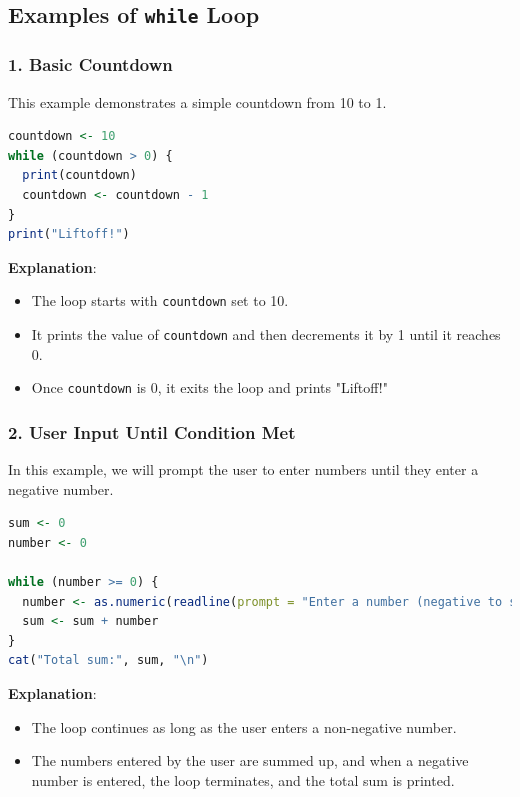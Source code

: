 \documentclass[10pt]{book}
\begin{document}
\subsection{Examples of \texttt{while} Loop}

\subsubsection{1. Basic Countdown}

This example demonstrates a simple countdown from 10 to 1.

\begin{lstlisting}[language=R]
countdown <- 10
while (countdown > 0) {
  print(countdown)
  countdown <- countdown - 1
}
print("Liftoff!")
\end{lstlisting}

\textbf{Explanation}:
\begin{itemize}
    \item The loop starts with \texttt{countdown} set to 10.
    \item It prints the value of \texttt{countdown} and then decrements it by 1 until it reaches 0.
    \item Once \texttt{countdown} is 0, it exits the loop and prints "Liftoff!"
\end{itemize}

\subsubsection{2. User Input Until Condition Met}

In this example, we will prompt the user to enter numbers until they enter a negative number.

\begin{lstlisting}[language=R]
sum <- 0
number <- 0

while (number >= 0) {
  number <- as.numeric(readline(prompt = "Enter a number (negative to stop): "))
  sum <- sum + number
}
cat("Total sum:", sum, "\n")
\end{lstlisting}

\textbf{Explanation}:
\begin{itemize}
    \item The loop continues as long as the user enters a non-negative number.
    \item The numbers entered by the user are summed up, and when a negative number is entered, the loop terminates, and the total sum is printed.
\end{itemize}
\end{document}
